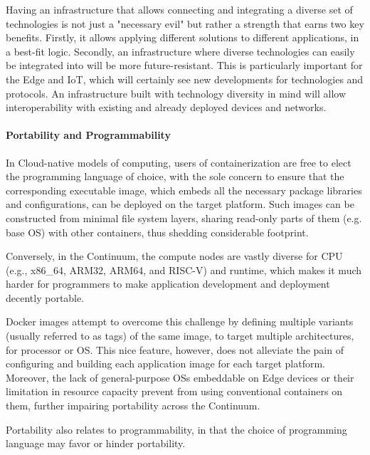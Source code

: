 Having an infrastructure that allows connecting and integrating a diverse set of technologies is not just a "necessary evil" but rather a strength that earns two key benefits. Firstly, it allows applying different solutions to different applications, in a best-fit logic. 
Secondly, an infrastructure where diverse technologies can easily be integrated into will be more future-resistant. 
This is particularly important for the Edge and IoT, which will certainly see new developments for technologies and protocols. An infrastructure built with technology diversity in mind will allow interoperability with existing and already deployed devices and networks.

\paragraph{Portability and Programmability}
In Cloud-native models of computing, users of containerization are free to elect the programming language of choice, with the sole concern to ensure that the corresponding executable image, which embeds all the necessary package libraries and configurations, can be deployed on the target platform. 
Such images can be constructed from minimal file system layers, sharing read-only parts of them (e.g. base OS) with other containers, thus shedding considerable footprint. 

Conversely, in the Continuum, the compute nodes are vastly diverse for CPU (e.g., x86\_64, ARM32, ARM64, and RISC-V) and runtime, which makes it much harder for programmers to make application development and deployment decently portable. 

Docker images attempt to overcome this challenge by defining multiple variants (usually referred to as tags) of the same image, to target multiple architectures, for processor or OS. 
This nice feature, however, does not alleviate the pain of configuring and building each application image for each target platform. Moreover, the lack of general-purpose OSs embeddable on Edge devices or their limitation in resource capacity prevent from using conventional containers on them, further impairing portability across the Continuum.

Portability also relates to programmability, in that the choice of programming language may favor or hinder portability. 

